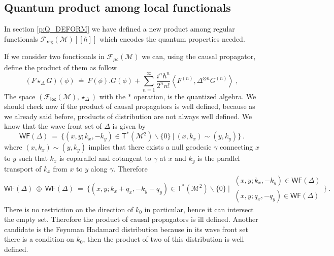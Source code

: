 \documentclass[11pt]{book}
\newcommand{\WF}{\mathsf{WF}}
\newcommand{\reg}{\mathsf{reg}}
\newcommand{\sm}[1]{\left\langle#1\right\rangle}
\newcommand{\Fcal}{\mathcal{F}}
\newcommand{\Mcal}{\mathcal{M}}
\newcommand{\Tsf}{\mathsf{T}}
\theoremstyle{break}
\begin{document}
\subsection{Quantum product among local functionals}


In section \ref{p:Q_DEFORM} we have defined a new product among regular functionals $\Fcal_\reg(\Mcal)[[\hbar]]$ which encodes the quantum properties needed.

If we consider two fonctionals in $\Fcal_{\mathsf{\mu c}}(\Mcal)$ we can, using the causal propagator, define the product of them as follow
\begin{equation*}
 (F \star_\Delta G)(\phi) \ \doteq \ F(\phi).G(\phi) + \sum_{n=1}^{\infty} \frac{i^n \hbar^n}{2^n n!} \sm{F^{(n)},\Delta^{\otimes n} G^{(n)}} \ ,
\end{equation*}
%
The space $\left( \Fcal_{\mathsf{loc}}(\Mcal) , \star_\Delta \right)$ with the $\ast$ operation, is the quantized algebra. We should check now if the product of causal propagators is well defined, because as we already said before, products of distribution are not always well defined. We know that the wave front set of $\Delta$ is given by
\begin{equation*}
 \WF(\Delta) \ = \ \bigg\{ \left(x,y;k_x,-k_y\right) \in \Tsf^{\ast}(\Mcal^{2}) \backslash\{0\} \ \bigg| \ (x,k_x) \sim (y,k_y) \bigg\} \ .
\end{equation*}
where $(x,k_x) \sim (y,k_y)$ implies that there exists a null geodesic $\gamma$ connecting $x$ to $y$ such that $k_x$ is coparallel and cotangent to $\gamma$ at $x$ and $k_y$ is the parallel transport of $k_x$ from $x$ to $y$ along $\gamma$. Therefore
\begin{equation*}
 \WF(\Delta) \ \oplus \ \WF(\Delta) \ = \ \bigg\{ \left(x,y;k_x+q_x,-k_y-q_y\right) \in \Tsf^{\ast}(\Mcal^{2}) \backslash\{0\} \ \bigg| \ 
 \begin{array}{l}
  \left(x,y;k_x,-k_y\right) \in \WF(\Delta) \\ 
  \left(x,y;q_x,-q_y\right) \in \WF(\Delta)
 \end{array}
 \bigg\} \ .
\end{equation*}
There is no restriction on the direction of $k_0$ in particular, hence it can intersect the empty set. Therefore the product of causal propagators is ill defined. Another candidate is the Feynman Hadamard distribution because in its wave front set there is a condition on $k_0$, then the product of two of this distribution is well defined. \par
\end{document}
